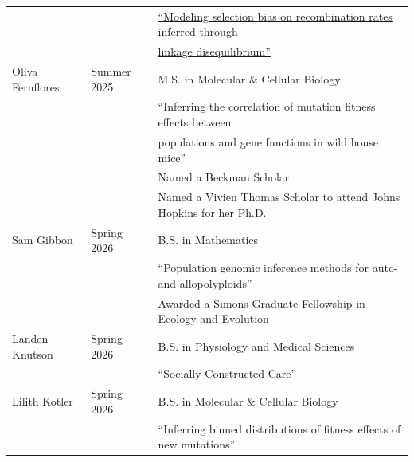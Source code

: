 \documentclass[11pt]{article}
\begin{document}
\begin{longtable}[l]{l l l}
&&\href{https://repository.arizona.edu/handle/10150/669879}{``Modeling selection bias on recombination rates inferred through}\\
&&\href{https://repository.arizona.edu/handle/10150/669879}{linkage disequilibrium''}\\
Oliva Fernflores & Summer 2025 & M.S. in Molecular \& Cellular Biology\\
&&``Inferring the correlation of mutation fitness effects between\\&& populations and gene functions in wild house mice''\\
&&Named a Beckman Scholar\\
&&Named a Vivien Thomas Scholar to attend Johns Hopkins for her Ph.D.\\
Sam Gibbon & Spring 2026 & B.S. in Mathematics\\
&&``Population genomic inference methods for auto- and allopolyploids''\\
&& Awarded a Simons Graduate Fellowship in Ecology and Evolution\\
Landen Knutson & Spring 2026 & B.S. in Physiology and Medical Sciences\\
&& ``Socially Constructed Care''\\
Lilith Kotler & Spring 2026 & B.S. in Molecular \& Cellular Biology\\
&&``Inferring binned distributions of fitness effects of new mutations''\\
\end{longtable}
\end{document}
